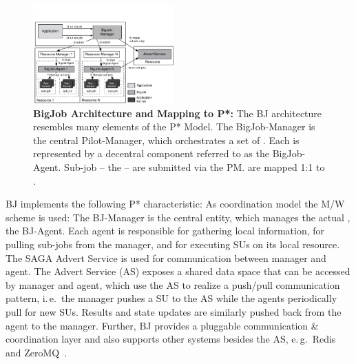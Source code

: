 \documentclass[conference]{IEEEtran}
\begin{document}

\begin{figure}[t]
	\up\upp
	\centering
	\includegraphics[width=0.48\textwidth]{../figures/re_bigjob_interactions.pdf}
	\caption{\textbf{BigJob Architecture and Mapping to P*:} The
          BJ architecture resembles many elements of the P* Model. The
          BigJob-Manager is the central Pilot-Manager, which
          orchestrates a set of \pilots. Each \pilot is represented by a
          decentral component referred to as the BigJob-Agent. Sub-job
          -- the \cus -- are submitted via the PM. \cus are mapped 1:1
          to \sus. %
        }
	\label{fig:figures_re_bigjob_interactions}
\end{figure}


BJ implements the following P* characteristic: As coordination model the M/W
scheme is used: The BJ-Manager is the central entity, which manages the actual
\pilot, the BJ-Agent. Each agent is responsible for gathering local
information, for pulling sub-jobs from the manager, and for executing SUs on
its local resource. The SAGA Advert Service is used for communication between
manager and agent. The Advert Service (AS) exposes a shared data space that
can be accessed by manager and agent, which use the AS to realize a push/pull
communication pattern, i.\,e.\ the manager pushes a SU to the AS while the
agents periodically pull for new SUs. Results and state updates are similarly
pushed back from the agent to the manager. Further, BJ provides a pluggable
communication \& coordination layer and also supports other \cc systems
besides the AS, e.\,g.\ Redis~\cite{redis} and ZeroMQ~\cite{zmq}.


\end{document}
